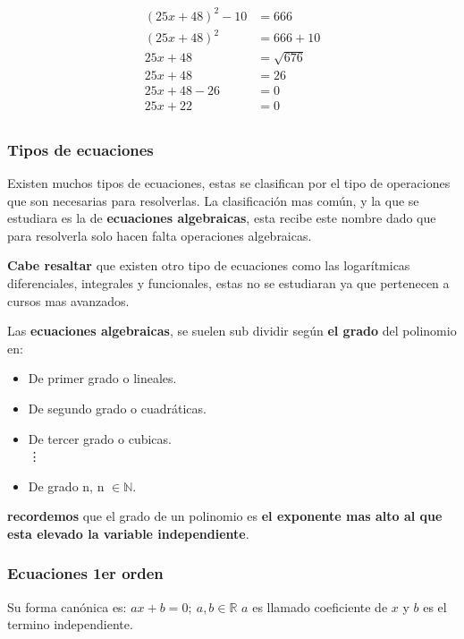     \begin{align*}
        (25x + 48)^2 -10 &= 666 \\
        (25x + 48)^2  &= 666+10 \\
        25x +48 &= \sqrt{676}\\
        25x + 48 &= 26 \\
        25x +48 -26 &= 0 \\
        25x+22 &= 0\\
    \end{align*}

\subsubsection{Tipos de ecuaciones}
    Existen muchos tipos de ecuaciones, estas se clasifican por el tipo de operaciones
    que son necesarias para resolverlas. La clasificación mas común, y la que se
    estudiara es la de \textbf{ecuaciones algebraicas}, esta recibe este nombre
    dado que para resolverla solo hacen falta operaciones algebraicas.

    \textbf{Cabe resaltar} que existen otro tipo de ecuaciones como las logarítmicas
    diferenciales, integrales y funcionales, estas no se estudiaran ya que
    pertenecen a cursos mas avanzados.

    Las \textbf{ecuaciones algebraicas}, se suelen sub dividir según \textbf{el
    grado} del polinomio en:

    \begin{itemize}
        \item De primer grado o lineales.
        \item De segundo grado o cuadráticas.
        \item De tercer grado o cubicas.\\
        \vdots
        \item De grado n, n $\in\mathbb{N}$.
    \end{itemize}
    \textbf{recordemos} que el grado de un polinomio es
    \textbf{el exponente mas alto al que esta elevado la variable independiente}.

    \subsubsection*{Ecuaciones 1er orden} \label{Ecuaciones-1er-orden}
    Su forma canónica es: $ax+b=0;\ a,b\in\mathbb{R}$ $a$ es llamado coeficiente
    de $x$ y $b$ es el termino independiente.

